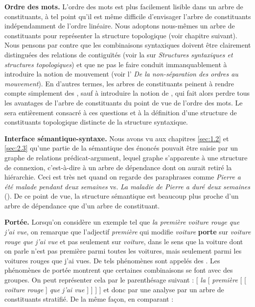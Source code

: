 {     \smallskip\noindent\textbf{Ordre des mots.}
    L’ordre des mots est plus facilement lisible dans un arbre de constituants, à tel point qu’il est même difficile d’envisager l’arbre de constituants indépendamment de l’ordre linéaire. Nous adoptons nous-mêmes un arbre de constituants pour représenter la structure topologique (voir chapitre suivant). Nous pensons par contre que les combinaisons syntaxiques doivent être clairement distinguées des relations de contiguïtés (voir la  sur \textit{Structures syntaxiques et structures topologiques}) et que ne pas le faire conduit immanquablement à introduire la notion de mouvement (voir l' \textit{De la non-séparation des ordres au mouvement}). En d’autres termes, les arbres de constituants peinent à rendre compte simplement des , sauf à introduire la notion de , qui fait alors perdre tous les avantages de l’arbre de constituants du point de vue de l’ordre des mots. Le  sera entièrement consacré à ces questions et à la définition d’une structure de constituants topologique distincte de la structure syntaxique.

    \smallskip\noindent\textbf{Interface sémantique-syntaxe.}
    Nous avons vu aux chapitres \ref{sec:1.2} et \ref{sec:2.3} qu’une partie de la sémantique des énoncés pouvait être saisie par un graphe de relations prédicat-argument, lequel graphe s’apparente à une structure de connexion, c’est-à-dire à un arbre de dépendance dont on aurait retiré la hiérarchie. Ceci est très net quand on regarde des paraphrases comme \textit{Pierre a été malade pendant deux semaines} vs. \textit{La maladie de Pierre a duré deux semaines} (). De ce point de vue, la structure sémantique est beaucoup plus proche d’un arbre de dépendance que d’un arbre de constituant.

    \smallskip\noindent\textbf{Portée.}
    Lorsqu’on considère un exemple tel que \textit{la première voiture rouge que j’ai vue}, on remarque que l’adjectif \textit{première} qui modifie \textit{voiture} \textbf{porte} sur \textit{voiture rouge que j’ai vue} et pas seulement sur \textit{voiture}, dans le sens que la voiture dont on parle n’est pas première parmi toutes les voitures, mais seulement parmi les voitures rouges que j’ai vues. De tels phénomènes sont appelés des . Les phénomènes de portée montrent que certaines combinaisons se font avec des groupes. On peut représenter cela par le parenthésage suivant :
    \ea{}
    [ \textit{la} [ \textit{première} [ [ \textit{voiture rouge} ] \textit{que j’ai vue} ] ] ] ]
    \z
    et donc par une analyse par un arbre de constituants stratifié. De la même façon, en comparant :

}
